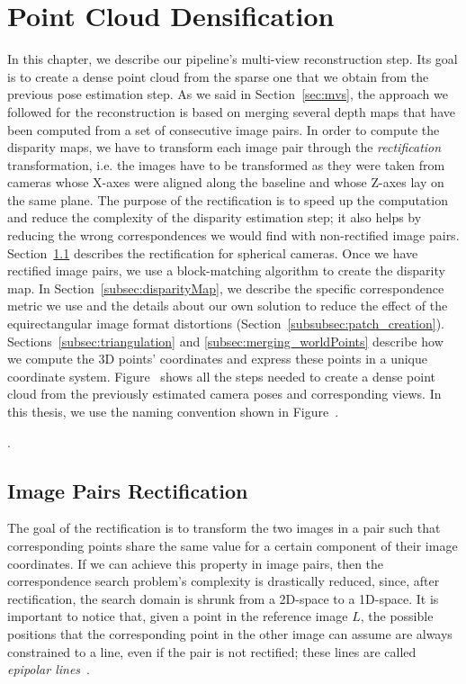 \section{Point Cloud Densification}
\label{sec:pipeline_densification}
In this chapter, we describe our pipeline's multi-view reconstruction step.
Its goal is to create a dense point cloud from the sparse one that we obtain
from the previous pose estimation step.
As we said in Section~\ref{sec:mvs}, the approach we followed for the
reconstruction is based on merging several depth maps that have been computed
from a set of consecutive image pairs.
In order to compute the disparity maps, we have to transform each image pair
through the \emph{rectification} transformation, i.e. the images have to be
transformed as they were taken from cameras whose X-axes were aligned along the
baseline and whose Z-axes lay on the same plane.
The purpose of the rectification is to speed up the computation and reduce the 
complexity of the disparity estimation step; it also helps by
reducing the wrong correspondences we would find with
non-rectified image pairs. Section~\ref{subsec:rectification} describes the
rectification for spherical cameras.
Once we have rectified image pairs, we use a block-matching algorithm to create
the disparity map. In Section~\ref{subsec:disparityMap}, we describe
the specific correspondence metric we use and the details about our own
solution to reduce the effect of the equirectangular image format distortions
(Section~\ref{subsubsec:patch_creation}).
Sections~\ref{subsec:triangulation} and \ref{subsec:merging_worldPoints}
describe how we compute the 3D points' coordinates and express these points in
a unique coordinate system.
Figure~ shows all the steps needed to
create a dense point cloud from the previously estimated camera poses and
corresponding views.
In this thesis, we use the naming convention shown in Figure~.

.



\subsection{Image Pairs Rectification}
\label{subsec:rectification}
The goal of the rectification is to transform the two images in a pair such that
corresponding points share the same value for a certain component of their
image coordinates. If we can achieve this property in image pairs, then the
correspondence search problem's complexity is drastically reduced, since,
after rectification, the search domain is shrunk from a
2D-space to a 1D-space.
It is important to notice that, given a point in the reference image $L$,
the possible positions that the corresponding point in the other image can
assume are always constrained to a line, even if the pair is not
rectified; these lines are called
\emph{epipolar lines}~\cite{Hartley2004,szeliski2010computer}.

